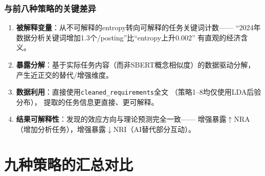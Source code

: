 \documentclass[12pt,a4paper]{ctexart}
\begin{document}
\subsubsection{与前八种策略的关键差异}

\begin{enumerate}
\item \textbf{被解释变量}：从不可解释的entropy转向可解释的任务关键词计数——
      ``2024年数据分析关键词增加1.3个/posting''比``entropy上升0.002''
      有直观的经济含义。
\item \textbf{暴露分解}：基于实际任务内容（而非SBERT概念相似度）的数据驱动分解，
      产生近正交的替代/增强维度。
\item \textbf{数据利用}：直接使用\texttt{cleaned\_requirements}全文
      （策略1--8均仅使用LDA后验分布），
      提取的任务信息更直接、更可解释。
\item \textbf{结果可解释性}：发现的效应方向与理论预测完全一致——
      增强暴露$\uparrow$NRA（增加分析任务），增强暴露$\downarrow$NRI（AI替代部分互动）。
\end{enumerate}


\section{九种策略的汇总对比}
\label{sec:comparison9}
\label{sec:comparison}
\end{document}
